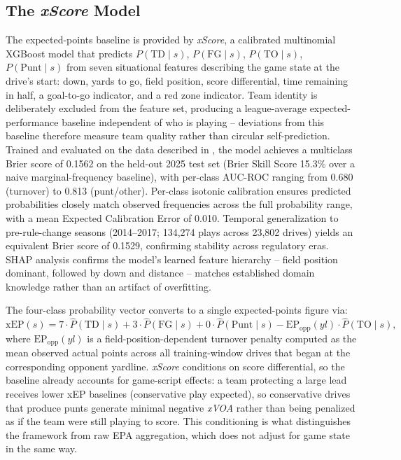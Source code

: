 \documentclass[12pt,a4paper]{article}
\newcommand{\xscore}{\textit{xScore}}
\newcommand{\xvoa}{\textit{xVOA}}
\begin{document}
\subsection{The \xscore{} Model}
\label{sec:xscore-recap}

The expected-points baseline is provided by \xscore{}, a calibrated multinomial XGBoost model that predicts $P(\text{TD} \mid s)$, $P(\text{FG} \mid s)$, $P(\text{TO} \mid s)$, $P(\text{Punt} \mid s)$ from seven situational features describing the game state at the drive's start: down, yards to go, field position, score differential, time remaining in half, a goal-to-go indicator, and a red zone indicator. Team identity is deliberately excluded from the feature set, producing a league-average expected-performance baseline independent of who is playing -- deviations from this baseline therefore measure team quality rather than circular self-prediction. Trained and evaluated on the data described in , the model achieves a multiclass Brier score of 0.1562 on the held-out 2025 test set (Brier Skill Score 15.3\% over a naive marginal-frequency baseline), with per-class AUC-ROC ranging from 0.680 (turnover) to 0.813 (punt/other). Per-class isotonic calibration ensures predicted probabilities closely match observed frequencies across the full probability range, with a mean Expected Calibration Error of 0.010. Temporal generalization to pre-rule-change seasons (2014--2017; 134,274 plays across 23,802 drives) yields an equivalent Brier score of 0.1529, confirming stability across regulatory eras. SHAP analysis confirms the model's learned feature hierarchy -- field position dominant, followed by down and distance -- matches established domain knowledge rather than an artifact of overfitting.

The four-class probability vector converts to a single expected-points figure via:
\begin{equation}
  \label{eq:xep}
  \text{xEP}(s) = 7 \cdot \hat{P}(\text{TD} \mid s)
                 + 3 \cdot \hat{P}(\text{FG} \mid s)
                 + 0 \cdot \hat{P}(\text{Punt} \mid s)
                 - \text{EP}_{\text{opp}}(yl) \cdot \hat{P}(\text{TO} \mid s),
\end{equation}
where $\text{EP}_{\text{opp}}(yl)$ is a field-position-dependent turnover penalty computed as the mean observed actual points across all training-window drives that began at the corresponding opponent yardline. \xscore{} conditions on score differential, so the baseline already accounts for game-script effects: a team protecting a large lead receives lower xEP baselines (conservative play expected), so conservative drives that produce punts generate minimal negative \xvoa{} rather than being penalized as if the team were still playing to score. This conditioning is what distinguishes the framework from raw EPA aggregation, which does not adjust for game state in the same way.
\end{document}
